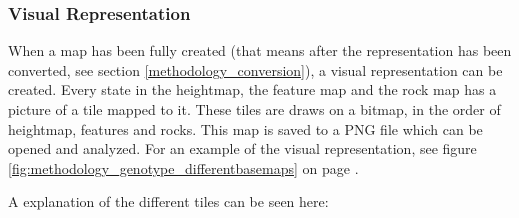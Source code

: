 \subsubsection{Visual Representation}
When a map has been fully created (that means after the representation has been converted, see section \ref{methodology_conversion}), a visual representation can be created. Every state in the heightmap, the feature map and the rock map has a picture of a tile mapped to it. These tiles are draws on a bitmap, in the order of heightmap, features and rocks. This map is saved to a PNG file which can be opened and analyzed. For an example of the visual representation, see figure \ref{fig:methodology_genotype_differentbasemaps} on page \pageref{fig:methodology_genotype_differentbasemaps}.

A explanation of the different tiles can be seen here:

